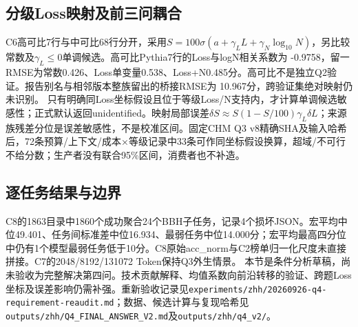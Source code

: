 \subsection{分级Loss映射及前三问耦合}
C6高可比7行与中可比68行分开，采用$S=100\sigma(a+\gamma_L L+\gamma_N\log_{10}N)$，另比较常数及$\gamma_L\le0$单调候选。高可比Pythia7行的Loss与logN相关系数为
-0.9758，留一RMSE为常数0.426、Loss单变量0.538、Loss+N0.485分。高可比不是独立Q2验证。报告别名与相邻版本整族留出的桥接RMSE为
10.967分，跨验证集绝对映射仍未识别。
只有明确同Loss坐标假设且位于等级Loss/N支持内，才计算单调候选敏感性；正式默认返回unidentified。映射局部误差$\delta S\approx S(1-S/100)\gamma_L\delta L$；来源族残差分位是误差敏感性，不是校准区间。固定CHM Q3 v8精确SHA及输入哈希后，72条预算/上下文/成本×等级记录中33条可作同坐标假设换算，超域/不可行不给分数；生产者没有联合95\%区间，消费者也不补造。

\subsection{逐任务结果与边界}
C8的1863目录中1860个成功聚合24个BBH子任务，记录4个损坏JSON。宏平均中位49.401、任务间标准差中位16.934、最弱任务中位14.000分；宏平均最高四分位中仍有1个模型最弱任务低于10分。C8原始acc\_norm与C2榜单归一化尺度未直接拼接。C7的2048/8192/131072 Token保持Q3外生情景。
本节是条件分析草稿，尚未验收为完整解决第四问。技术贡献解释、均值系数向前沿转移的验证、跨题Loss坐标及误差影响仍需补强。重新验收记录见\texttt{experiments/zhh/20260926-q4-requirement-reaudit.md}；数据、候选计算与复现哈希见\texttt{outputs/zhh/Q4\_FINAL\_ANSWER\_V2.md}及\texttt{outputs/zhh/q4\_v2/}。

